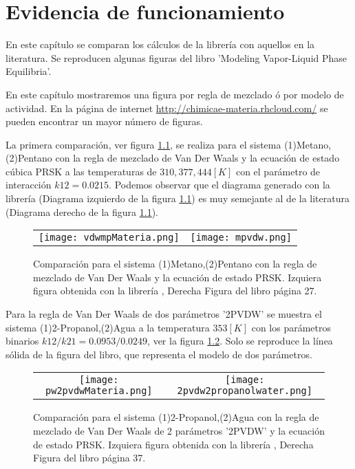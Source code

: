 \chapter{Evidencia de funcionamiento}\label{chap:performanceEvidence}

En este capítulo se comparan los cálculos de la librería \Materia con aquellos en la literatura.  Se reproducen algunas figuras del libro 'Modeling Vapor-Liquid Phase Equilibria'\cite{mvle}.

En este capítulo mostraremos una figura por regla de mezclado ó por modelo de actividad. En la página de internet \url{http://chimicae-materia.rhcloud.com/} se pueden encontrar un mayor número de figuras.

La primera comparación, ver figura \ref{fig:mpvdw}, se realiza para el sistema (1)Metano,(2)Pentano con la regla de mezclado de Van Der Waals y la ecuación de estado cúbica PRSK a las temperaturas de $310, 377, 444  [K]$ con el parámetro de interacción $k12=0.0215$. Podemos observar que el diagrama generado con la librería \Materia (Diagrama izquierdo de la figura \ref{fig:mpvdw}) es muy semejante al de la literatura (Diagrama derecho de la figura \ref{fig:mpvdw}).

\begin{figure}[H]
	\begin{tabular}{c c}
		\texttt{[image: vdwmpMateria.png]}
		&
		 \texttt{[image: mpvdw.png]}
	\end{tabular}
	\caption{Comparación para el sistema (1)Metano,(2)Pentano con la regla de mezclado de Van Der Waals y la ecuación de estado PRSK. Izquiera figura obtenida con la librería \Materia, Derecha Figura del libro \cite{mvle} página 27.} 
	\label{fig:mpvdw}
\end{figure}

Para la regla de Van Der Waals de dos parámetros '2PVDW' se muestra el sistema (1)2-Propanol,(2)Agua a la temperatura $353[K]$ con los parámetros binarios $k12/k21 = 0.0953/0.0249$, ver la figura \ref{fig:pw2pvdw}. Solo se reproduce la línea sólida de la figura del libro, que representa el modelo de dos parámetros.

\begin{figure}[H]
	\begin{tabular}{c c}
		\texttt{[image: pw2pvdwMateria.png]}
		&
		 \texttt{[image: 2pvdw2propanolwater.png]}
	\end{tabular}
	\caption{Comparación para el sistema (1)2-Propanol,(2)Agua con la regla de mezclado de Van Der Waals de 2 parámetros '2PVDW' y la ecuación de estado PRSK.  Izquiera figura obtenida con la librería \Materia, Derecha Figura del libro \cite{mvle} página 37.} 
	\label{fig:pw2pvdw}
\end{figure}

